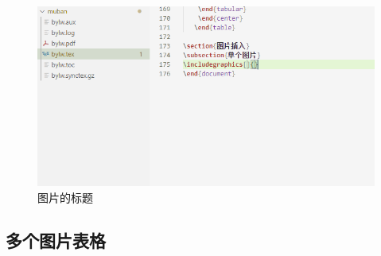 \documentclass[12pt]{article}
\numberwithin{equation}{section}
\begin{document}
\begin{figure}[h]
    \centering %
    \caption{图片的标题}
    \includegraphics[scale=0.8]{f1.PNG}
    \end{figure}

\subsection{多个图片表格}

\begin{figure}[!htp]
    \begin{floatrow}
    \end{floatrow}
  \end{figure}
\end{document}

